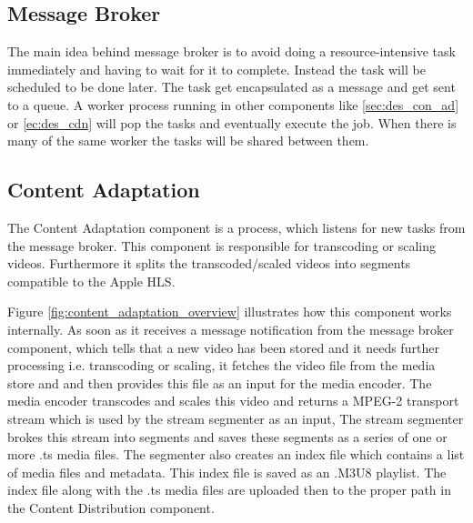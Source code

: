 \subsection{Message Broker\label{sec:des_worker_queue}}
The main idea behind message broker is to avoid doing a resource-intensive task immediately and having to wait for it to complete. Instead the task will be scheduled to be done later. The task get encapsulated as a message and  get sent to a queue. A worker process running in other components like \ref{sec:des_con_ad} or \ref{ec:des_cdn} will pop the tasks and eventually execute the job. When there is many of the same worker the tasks will be shared between them.


\subsection{Content Adaptation\label{sec:des_con_ad}}
The Content Adaptation component is a process, which listens for new tasks from the message broker. This component is responsible for transcoding or scaling videos. Furthermore it splits the transcoded/scaled videos into segments compatible to the Apple HLS. %

Figure \ref{fig:content_adaptation_overview} illustrates how this component works internally. As soon as it receives a message notification from the message broker component, which tells that a new video has been stored and it needs further processing i.e. transcoding or scaling, it fetches the video file from the media store and and then provides this file as an input for the media encoder. The media encoder transcodes and scales this video and returns a MPEG-2 transport stream which is used by the stream segmenter as an input, The stream segmenter brokes this stream into segments and saves these segments as a series of one or more .ts media files. The segmenter also creates an index file which contains a list of media files and metadata. This index file is saved as an .M3U8 playlist. The index file along with the .ts media files are uploaded then to the proper path in the Content Distribution component.


